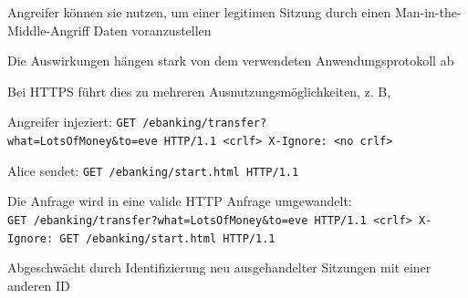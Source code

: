 \documentclass[a4paper]{article}
\begin{document}
\begin{multicols}{3}
\begin{itemize*}
\begin{itemize*}
                  \begin{itemize*}
                        \item Angreifer können sie nutzen, um einer legitimen Sitzung durch einen Man-in-the-Middle-Angriff Daten voranzustellen
                        \item Die Auswirkungen hängen stark von dem verwendeten Anwendungsprotokoll ab
                  \end{itemize*}
                  \item Bei HTTPS führt dies zu mehreren Ausnutzungsmöglichkeiten, z. B,
                  \begin{itemize*}
                        \item Angreifer injeziert: \texttt{GET\ /ebanking/transfer?what=LotsOfMoney\&to=eve\ HTTP/1.1\ <crlf>{}\ X-Ignore:\ <no\ crlf>{}}
                        \item Alice sendet: \texttt{GET\ /ebanking/start.html\ HTTP/1.1}
                        \item Die Anfrage wird in eine valide HTTP Anfrage umgewandelt: \texttt{GET\ /ebanking/transfer?what=LotsOfMoney\&to=eve\ HTTP/1.1\ <crlf>{}\ X-Ignore:\ GET\ /ebanking/start.html\ HTTP/1.1}
                  \end{itemize*}
                  \item Abgeschwächt durch Identifizierung neu ausgehandelter Sitzungen mit einer anderen ID
            \end{itemize*}
      \end{itemize*}


\end{multicols}
\end{document}

